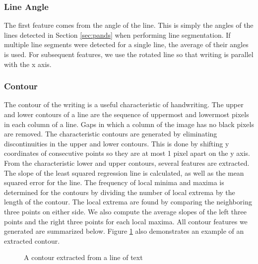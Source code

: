 \documentclass[paper=a4, fontsize=11pt]{scrartcl} %
\numberwithin{equation}{section} %
\numberwithin{figure}{section} %
\numberwithin{table}{section} %
\begin{document}
\subsubsection{Line Angle}
The first feature comes from the angle of the line. This is simply the
angles of the lines detected in Section \ref{sec:pands} when
performing line segmentation. If multiple line segments were detected
for a single line, the average of their angles is used. For subsequent
features, we use the rotated line so that writing is parallel with the
x axis.

\subsubsection{Contour}
The contour of the writing is a useful characteristic of
handwriting. The upper and lower contours of a line are the sequence
of uppermost and lowermost pixels in each column of a line. Gaps in
which a column of the image has no black pixels are removed. The
characteristic contours are generated by eliminating discontinuities
in the upper and lower contours. This is done by shifting y
coordinates of consecutive points so they are at most 1 pixel apart on
the y axis. From the characteristic lower and upper contours, several
features are extracted. The slope of the least squared regression line
is calculated, as well as the mean squared error for the line. The
frequency of local minima and maxima is determined for the contours by
dividing the number of local extrema by the length of the contour. The
local extrema are found by comparing the neighboring three points on
either side. We also compute the average slopes of the left three
points and the right three points for each local maxima. All contour
features we generated are summarized below. Figure \ref{fig:contourimage} also demonstrates an example of an extracted contour.

\begin{figure}
\label{fig:contourimage}
\caption{A contour extracted from a line of text}
\end{figure}
\end{document}
